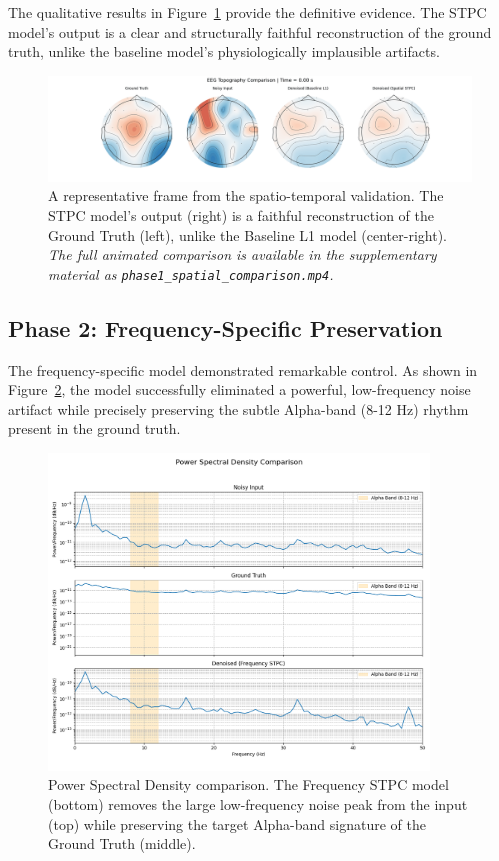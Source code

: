 \documentclass[11pt, a4paper]{article}
\begin{document}
The qualitative results in Figure~\ref{fig:phase1} provide the definitive evidence. The STPC model's output is a clear and structurally faithful reconstruction of the ground truth, unlike the baseline model's physiologically implausible artifacts.

\begin{figure}[H]
    \centering
    \includegraphics[width=\textwidth]{figures/phase1_spatial_comparison.png} 
    \caption{A representative frame from the spatio-temporal validation. The STPC model's output (right) is a faithful reconstruction of the Ground Truth (left), unlike the Baseline L1 model (center-right). \textit{The full animated comparison is available in the supplementary material as \texttt{phase1\_spatial\_comparison.mp4}.}}
    \label{fig:phase1}
\end{figure}

\subsection{Phase 2: Frequency-Specific Preservation}
The frequency-specific model demonstrated remarkable control. As shown in Figure~\ref{fig:phase2}, the model successfully eliminated a powerful, low-frequency noise artifact while precisely preserving the subtle Alpha-band (8-12 Hz) rhythm present in the ground truth.

\begin{figure}[H]
    \centering
    \includegraphics[width=0.9\textwidth]{figures/phase2_frequency_comparison.png}
    \caption{Power Spectral Density comparison. The Frequency STPC model (bottom) removes the large low-frequency noise peak from the input (top) while preserving the target Alpha-band signature of the Ground Truth (middle).}
    \label{fig:phase2}
\end{figure}
\end{document}
